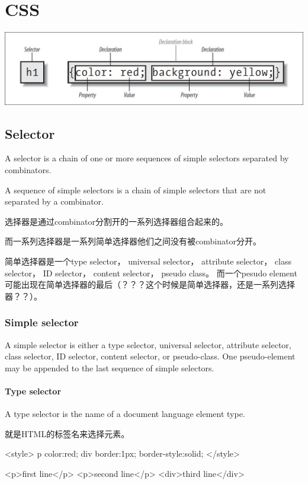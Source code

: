 \chapter{CSS}

\includegraphics[scale=0.75]{css/resources/css-rule.jpg}

\section{Selector}

A selector is a chain of one or more sequences of simple selectors separated by combinators.

A sequence of simple selectors is a chain of simple selectors that are not separated by a combinator.



选择器是通过combinator分割开的一系列选择器组合起来的。

而一系列选择器是一系列简单选择器他们之间没有被combinator分开。

简单选择器是一个type selector， universal selector， attribute selector， class selector， ID selector， content selector， pseudo class。 而一个pesudo element可能出现在简单选择器的最后（？？？这个时候是简单选择器，还是一系列选择器？？）。


\subsection{Simple selector}

A simple selector is either a type selector, universal selector, attribute selector, class selector, ID selector, content selector, or pseudo-class. One pseudo-element may be appended to the last sequence of simple selectors.

\subsubsection{Type selector}

A type selector is the name of a document language element type.

就是HTML的标签名来选择元素。

\begin{CSS}
<style>
p {color:red;}
div {border:1px; border-style:solid;}
</style>

<p>first line</p>
<p>second line</p>
<div>third line</div>
\end{CSS}


